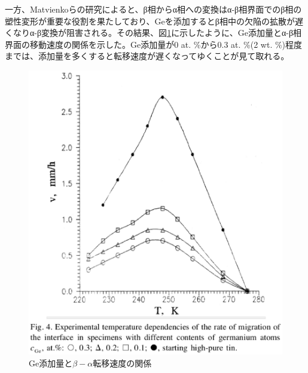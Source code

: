 一方、Matvienkoらの研究\cite{Matvienko}によると、β相からα相への変換はα-β相界面でのβ相の塑性変形が重要な役割を果たしており、Geを添加するとβ相中の欠陥の拡散が遅くなりα-β変換が阻害される。その結果、図\ref{fig:Ge_content}に示したように、Ge添加量とα-β相界面の移動速度の関係を示した\cite{Matvienko}。Ge添加量が0 at. \%から0.3 at. \%(2 wt. \%)程度までは、添加量を多くすると転移速度が遅くなってゆくことが見て取れる。
\begin{figure}[!h]
    \begin{center}
   \includegraphics[width=0.9\hsize]{Introduction/Ge_content.eps}
  \end{center}
  \caption{Ge添加量と$\beta-\alpha$転移速度の関係\cite{Matvienko}}
  \label{fig:Ge_content}
\end{figure}

\clearpage

